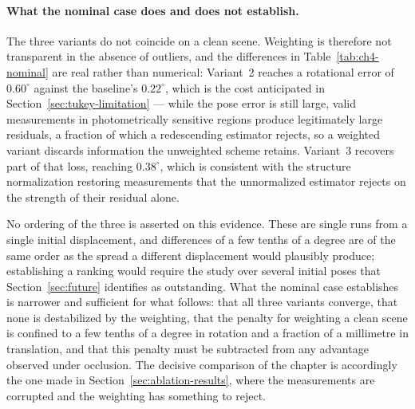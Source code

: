 \paragraph{What the nominal case does and does not establish.}
The three variants do not coincide on a clean scene. Weighting is therefore not
transparent in the absence of outliers, and the differences in
Table~\ref{tab:ch4-nominal} are real rather than numerical: Variant~2 reaches a
rotational error of $0.60^{\circ}$ against the baseline's $0.22^{\circ}$, which
is the cost anticipated in Section~\ref{sec:tukey-limitation} --- while the pose
error is still large, valid measurements in photometrically sensitive regions
produce legitimately large residuals, a fraction of which a redescending
estimator rejects, so a weighted variant discards information the unweighted
scheme retains. Variant~3 recovers part of that loss, reaching $0.38^{\circ}$,
which is consistent with the structure normalization restoring measurements
that the unnormalized estimator rejects on the strength of their residual
alone.

No ordering of the three is asserted on this evidence. These are single runs
from a single initial displacement, and differences of a few tenths of a degree
are of the same order as the spread a different displacement would plausibly
produce; establishing a ranking would require the study over several initial
poses that Section~\ref{sec:future} identifies as outstanding. What the nominal
case establishes is narrower and sufficient for what follows: that all three
variants converge, that none is destabilized by the weighting, that the penalty
for weighting a clean scene is confined to a few tenths of a degree in
rotation and a fraction of a millimetre in translation, and that this penalty
must be subtracted from any advantage observed under occlusion. The decisive
comparison of the chapter is accordingly the one made in
Section~\ref{sec:ablation-results}, where the measurements are corrupted and
the weighting has something to reject.

